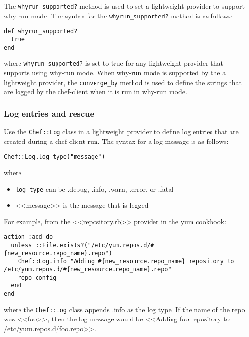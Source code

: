 The \lstinline!whyrun_supported?! method is used to set a lightweight provider to support why-run mode. The syntax for the \lstinline!whyrun_supported?! method is as follows:

\begin{lstlisting}[label=lst:cookbook-lwrp-why-run]
def whyrun_supported?
  true
end
\end{lstlisting}

where \lstinline!whyrun_supported?! is set to true for any lightweight provider that supports using why-run mode. When why-run mode is supported by the a lightweight provider, the \lstinline!converge_by! method is used to define the strings that are logged by the chef-client when it is run in why-run mode.

\subsubsection{Log entries and rescue}

Use the \lstinline!Chef::Log! class in a lightweight provider to define log entries that are created during a chef-client run. The syntax for a log message is as follows:

\begin{lstlisting}[label=lst:cookbook-lwrp-logs1]
Chef::Log.log_type("message")
\end{lstlisting}

where

\begin{itemize}
  \item \lstinline!log_type! can be .debug, .info, .warn, .error, or .fatal
  \item <<message>> is the message that is logged
\end{itemize}

For example, from the <<repository.rb>> provider in the yum cookbook:

\begin{lstlisting}[label=lst:cookbook-lwrp-logs2]
action :add do
  unless ::File.exists?("/etc/yum.repos.d/#{new_resource.repo_name}.repo")
    Chef::Log.info "Adding #{new_resource.repo_name} repository to /etc/yum.repos.d/#{new_resource.repo_name}.repo"
    repo_config
  end
end
\end{lstlisting}

where the \lstinline!Chef::Log! class appends .info as the log type. If the name of the repo was <<foo>>, then the log message would be <<Adding foo repository to /etc/yum.repos.d/foo.repo>>.

